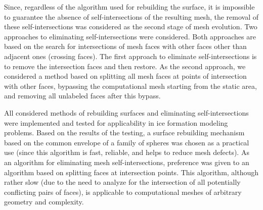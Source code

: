 \documentclass[
11pt,%
tightenlines,%
twoside,%
onecolumn,%
nofloats,%
nobibnotes,%
nofootinbib,%
superscriptaddress,%
noshowpacs,%
centertags]%
{revtex4-2}
\begin{document}
Since, regardless of the algorithm used for rebuilding the surface, it is impossible to guarantee the absence of self-intersections of the resulting mesh, the removal of these self-intersections was considered as the second stage of mesh evolution.
Two approaches to eliminating self-intersections were considered.
Both approaches are based on the search for intersections of mesh faces with other faces other than adjacent ones (crossing faces).
The first approach to eliminate self-intersections is to remove the intersection faces and then restore.
As the second approach, we considered a method based on splitting all mesh faces at points of intersection with other faces, bypassing the computational mesh starting from the static area, and removing all unlabeled faces after this bypass.

All considered methods of rebuilding surfaces and eliminating self-intersections were implemented and tested for applicability in ice formation modeling problems.
Based on the results of the testing, a surface rebuilding mechanism based on the common envelope of a family of spheres was chosen as a practical use (since this algorithm is fast, reliable, and helps to reduce mesh defects).
As an algorithm for eliminating mesh self-intersections, preference was given to an algorithm based on splitting faces at intersection points.
This algorithm, although rather slow (due to the need to analyze for the intersection of all potentially conflicting pairs of faces), is applicable to computational meshes of arbitrary geometry and complexity.
\end{document}
